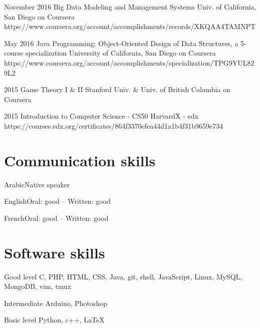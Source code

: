 \documentclass{tccv}
\begin{document}
\begin{courseslist}

\item
    []
    {November 2016}
    {Big Data Modeling and Management Systems}
    {Univ. of California, San Diego on Coursera}
    {https://www.coursera.org/account/accomplishments/records/XKQAA4TAMNPT}


\item
    []
    {May 2016}
    {Java Programming: Object-Oriented Design of Data Structures, a 5-course specialization}
    {University of California, San Diego on Coursera}
    {https://www.coursera.org/account/accomplishments/specialization/TPG9YUL829L2}

\item
    []
    {2015}
    {Game Theory I \& II}
    {Stanford Univ. \& Univ. of British Columbia on Coursera}
    {}

\item
    []
    {2015}
    {Introduction to Computer Science - CS50}
    {HarvardX - edx}
    {https://courses.edx.org/certificates/864f3370efea44d1a1b4f31b9659e734}

\end{courseslist}

\section{Communication skills}

\begin{factlist}
\item{Arabic}{Native speaker}
\item{English}{Oral: good -- Written: good}
\item{French}{Oral: good -- Written: good}
\end{factlist}

\section{Software skills}

\begin{factlist}

\item{Good level}
     {C, PHP, HTML, CSS, Java, git, shell,
      JavaScript, Linux, MySQL, MongoDB, vim, tmux}

\item{Intermediate}
     {Arduino, Photoshop}

\item{Basic level}
     {Python, c++, \LaTeX}

\end{factlist}
\end{document}
